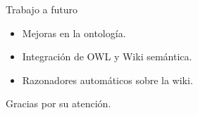 \documentclass[notes=show,19 pt]{beamer}
\begin{document}
\begin{frame}{Trabajo a futuro}
\begin{LARGE}
	\begin{itemize}
		\item Mejoras en la ontología.
		\item Integración de OWL y Wiki semántica.
		\item Razonadores automáticos sobre la wiki.
	\end{itemize}
\end{LARGE}
\end{frame}

\begin{frame}[c]{}
	\begin{Huge}
	\begin{center}
		Gracias por su atención.
	\end{center}
	\end{Huge}
\end{frame}
\end{document}

